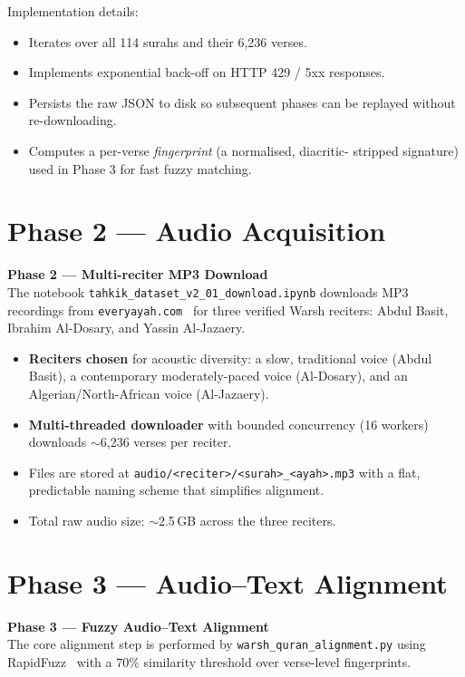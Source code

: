 \documentclass[12pt,a4paper]{report}
\newcommand{\phaseblock}[3]{%
  \begin{tcolorbox}[
    enhanced, colback=white, colframe=black,
    leftrule=5pt, sharp corners, before upper={\parindent0pt}
  ]
  {\bfseries\color{black}Phase #1 --- #2}\\[4pt]
  \small #3
  \end{tcolorbox}%
}
\begin{document}
Implementation details:
\begin{itemize}
  \item Iterates over all 114 surahs and their 6{,}236 verses.
  \item Implements exponential back-off on HTTP 429 / 5xx responses.
  \item Persists the raw JSON to disk so subsequent phases can be replayed
        without re-downloading.
  \item Computes a per-verse \emph{fingerprint} (a normalised, diacritic-
        stripped signature) used in Phase 3 for fast fuzzy matching.
\end{itemize}

\section{Phase 2 --- Audio Acquisition}

\phaseblock{2}{Multi-reciter MP3 Download}{The notebook
\texttt{tahkik\_dataset\_v2\_01\_download.ipynb} downloads MP3 recordings
from \texttt{everyayah.com}~\cite{everyayah} for three verified Warsh
reciters: Abdul Basit, Ibrahim Al-Dosary, and Yassin Al-Jazaery.}

\begin{itemize}
  \item \textbf{Reciters chosen} for acoustic diversity: a slow,
        traditional voice (Abdul Basit), a contemporary moderately-paced
        voice (Al-Dosary), and an Algerian/North-African voice
        (Al-Jazaery).
  \item \textbf{Multi-threaded downloader} with bounded concurrency
        (16 workers) downloads $\sim$6{,}236 verses per reciter.
  \item Files are stored at \texttt{audio/<reciter>/<surah>\_<ayah>.mp3}
        with a flat, predictable naming scheme that simplifies alignment.
  \item Total raw audio size: $\sim$2.5\,GB across the three reciters.
\end{itemize}

\section{Phase 3 --- Audio--Text Alignment}

\phaseblock{3}{Fuzzy Audio--Text Alignment}{The core alignment step is
performed by \texttt{warsh\_quran\_alignment.py} using
RapidFuzz~\cite{rapidfuzz} with a $70\%$ similarity threshold over
verse-level fingerprints.}
\end{document}
